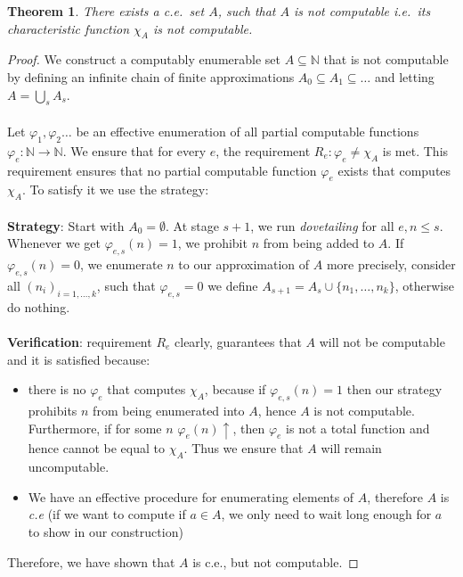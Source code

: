 \documentclass{pracalicmgr2025}
\theoremstyle{plain}            %
\newtheorem{theorem}{Theorem}[chapter]
\theoremstyle{remark}           %
\theoremstyle{definition}       %
\begin{document}
\begin{theorem}
    There exists a c.e.\ set $A$, such that $A$ is not computable i.e.\ its characteristic function $\chi_A$ is not computable.
\end{theorem}
 \begin{proof}

We construct a computably enumerable set $A \subseteq \mathbb{N}$ that is not computable by defining an infinite chain of finite approximations $A_0 \subseteq A_1 \subseteq \dots$ and letting $A = \bigcup_s A_s$.
\\
\\
Let $\varphi_1, \varphi_2 \dots$ be an effective enumeration of all partial computable functions $\varphi_e:\mathbb{N}\to\mathbb{N}$. We ensure that for every $e$, the requirement 
$R_e: \varphi_e \neq \chi_A$ 
is met. This requirement ensures that no partial computable function $\varphi_e$ exists that computes $\chi_A$. To satisfy it we use the strategy:
\\
\\
\textbf{Strategy}: Start with $A_0 = \emptyset$. At stage $s+1$, we run \textit{dovetailing} for all $e,n\le s$. Whenever we get $\varphi_{e,s}(n)= 1$, we prohibit $n$ from being added to $A$. If $\varphi_{e,s}(n)= 0$, we enumerate $n$ to our approximation of $A$ more precisely, consider all $(n_i)_{i =1,\dots,k}$, such that $\varphi_{e,s} = 0$ we define $A_{s+1} = A_s \cup \{n_1,\dots,n_k\}$, otherwise do nothing.
\\
\\
\textbf{Verification}: requirement $R_e$ clearly, guarantees that $A$ will not be computable and it is satisfied because:
\begin{itemize}
    \item there is no $\varphi_e$ that computes $\chi_A$, because if $\varphi_{e,s}(n)= 1$ then our strategy prohibits $n$ from being enumerated into $A$, hence $A$ is not computable. Furthermore, if for some $n$ $\varphi_e(n)\uparrow$, then $\varphi_e$ is not a total function and hence cannot be equal to $\chi_A$. Thus we ensure that $A$ will remain uncomputable.
    
    \item We have an effective procedure for enumerating elements of $A$, therefore $A$ is \textit{c.e} (if we want to compute if $a \in A$, we only need to wait long enough for $a$ to show in our construction)
\end{itemize}
Therefore, we have shown that $A$ is c.e., but not computable. 

\end{proof}
\end{document}
